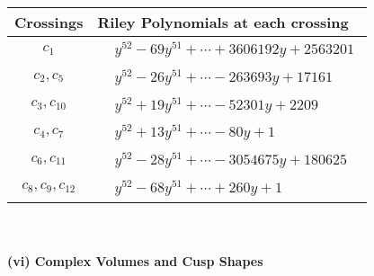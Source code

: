 \documentclass[1p]{elsarticle_modified}
\theoremstyle{definition}
\begin{document}
\begin{tabular}{m{50pt}|m{274pt}}
Crossings & \hspace{64pt}Riley Polynomials at each crossing \\
\hline $$\begin{aligned}c_{1}\end{aligned}$$&$\begin{aligned}
&y^{52}-69 y^{51}+\cdots+3606192 y+2563201
\end{aligned}$\\
\hline $$\begin{aligned}c_{2},c_{5}\end{aligned}$$&$\begin{aligned}
&y^{52}-26 y^{51}+\cdots-263693 y+17161
\end{aligned}$\\
\hline $$\begin{aligned}c_{3},c_{10}\end{aligned}$$&$\begin{aligned}
&y^{52}+19 y^{51}+\cdots-52301 y+2209
\end{aligned}$\\
\hline $$\begin{aligned}c_{4},c_{7}\end{aligned}$$&$\begin{aligned}
&y^{52}+13 y^{51}+\cdots-80 y+1
\end{aligned}$\\
\hline $$\begin{aligned}c_{6},c_{11}\end{aligned}$$&$\begin{aligned}
&y^{52}-28 y^{51}+\cdots-3054675 y+180625
\end{aligned}$\\
\hline $$\begin{aligned}c_{8},c_{9},c_{12}\end{aligned}$$&$\begin{aligned}
&y^{52}-68 y^{51}+\cdots+260 y+1
\end{aligned}$\\
\hline
\end{tabular}\\~\\
\newpage\flushleft \textbf{(vi) Complex Volumes and Cusp Shapes}
\end{document}
